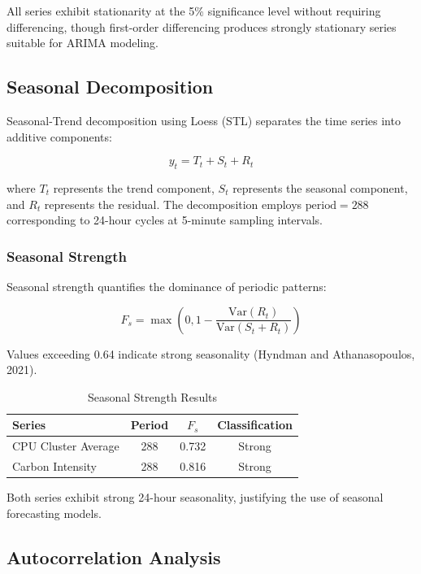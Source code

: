 \documentclass[12pt]{report}
\begin{document}
All series exhibit stationarity at the 5\% significance level without requiring differencing, though first-order differencing produces strongly stationary series suitable for ARIMA modeling.

\subsection{Seasonal Decomposition}

Seasonal-Trend decomposition using Loess (STL) separates the time series into additive components:

\begin{equation}
y_t = T_t + S_t + R_t
\end{equation}

where $T_t$ represents the trend component, $S_t$ represents the seasonal component, and $R_t$ represents the residual. The decomposition employs $\text{period} = 288$ corresponding to 24-hour cycles at 5-minute sampling intervals.

\subsubsection{Seasonal Strength}

Seasonal strength quantifies the dominance of periodic patterns:

\begin{equation}
F_s = \max\left(0, 1 - \frac{\text{Var}(R_t)}{\text{Var}(S_t + R_t)}\right)
\end{equation}

Values exceeding 0.64 indicate strong seasonality (Hyndman and Athanasopoulos, 2021).

\begin{table}[H]
\centering
\caption{Seasonal Strength Results}
\label{tab:seasonal_strength}
\begin{tabular}{lccc}
\toprule
\textbf{Series} & \textbf{Period} & \textbf{$F_s$} & \textbf{Classification} \\
\midrule
CPU Cluster Average & 288 & 0.732 & Strong \\
Carbon Intensity & 288 & 0.816 & Strong \\
\bottomrule
\end{tabular}
\end{table}

Both series exhibit strong 24-hour seasonality, justifying the use of seasonal forecasting models.

\subsection{Autocorrelation Analysis}
\end{document}
